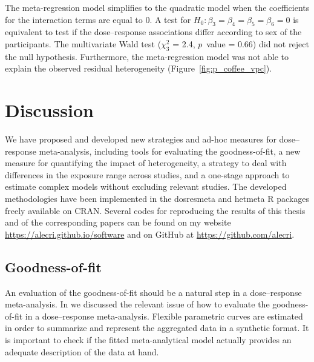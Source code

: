 \documentclass[11pt,a4paper,twoside,openany]{book}\usepackage{knitr}
\newcommand{\pkg}[1]{{\fontseries{b}\selectfont #1}}
\begin{document}
{{\noindent The meta-regression model simplifies to the quadratic model when the coefficients for the interaction terms are equal to 0. A test for $H_0: \beta_3 = \beta_4 = \beta_5 = \beta_6 = 0$ is equivalent to test if the dose--response associations differ according to sex of the participants.  The multivariate Wald test ($\chi_3^2$ = 2.4, $p$~value = 0.66) did not reject the null hypothesis. Furthermore, the meta-regression model was not able to explain the observed residual heterogeneity (Figure~\ref{fig:p_coffee_vpc}).


%

\chapter{Discussion}

We have proposed and developed new strategies and ad-hoc measures for dose--response meta-analysis, including tools for evaluating the goodness-of-fit, a new measure for quantifying the impact of heterogeneity, a strategy to deal with differences in the exposure range across studies, and a one-stage approach to estimate complex models without excluding relevant studies.
The developed methodologies have been implemented in the \pkg{dosresmeta} and \pkg{hetmeta} \textsf{R} packages freely available on CRAN. Several codes for reproducing the results of this thesis and of the corresponding papers can be found on my website \url{ https://alecri.github.io/software} and on GitHub at \url{ https://github.com/alecri}.


\section{Goodness-of-fit}

An evaluation of the goodness-of-fit should be a natural step in a dose--response meta-analysis. In  we discussed the relevant issue of how to evaluate the goodness-of-fit in a dose--response meta-analysis. Flexible parametric curves are estimated in order to summarize and represent the aggregated data in a synthetic format. It is important to check if the fitted meta-analytical model actually provides an adequate description of the data at hand. 

}}
\end{document}
